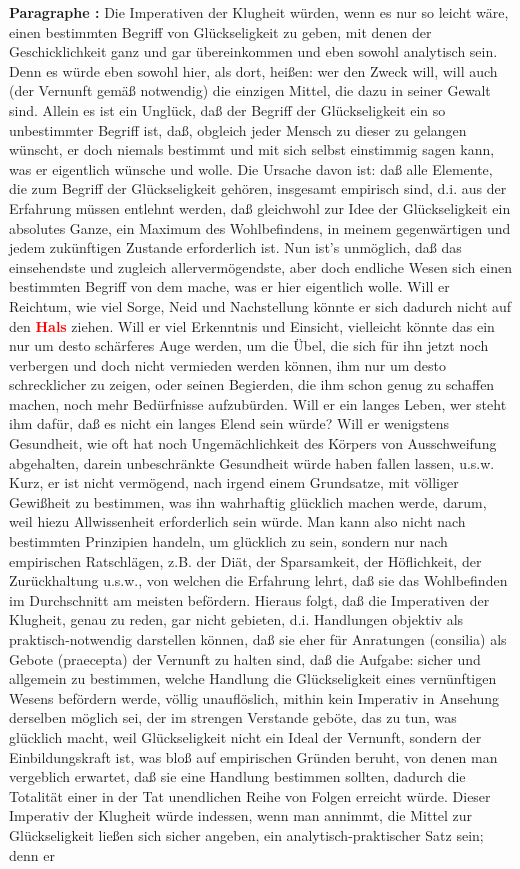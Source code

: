 \documentclass[a4paper,12pt,twoside]{book}
\newcommand{\match}[1]{\textcolor{red}{\textbf{#1}}}
\begin{document}
	\noindent\textbf{Paragraphe : }Die Imperativen der Klugheit würden, wenn es nur so leicht wäre, einen bestimmten Begriff von Glückseligkeit zu geben, mit denen der Geschicklichkeit ganz und gar übereinkommen und eben sowohl analytisch sein. Denn es würde eben sowohl hier, als dort, heißen: wer den Zweck will, will auch (der Vernunft gemäß notwendig) die einzigen Mittel, die dazu in seiner Gewalt sind. Allein es ist ein Unglück, daß der Begriff der Glückseligkeit ein so unbestimmter Begriff ist, daß, obgleich jeder Mensch zu dieser zu gelangen wünscht, er doch niemals bestimmt und mit sich selbst einstimmig sagen kann, was er eigentlich wünsche und wolle. Die Ursache davon ist: daß alle Elemente, die zum Begriff der Glückseligkeit gehören, insgesamt empirisch sind, d.i. aus der Erfahrung müssen entlehnt werden, daß gleichwohl zur Idee der Glückseligkeit ein absolutes Ganze, ein Maximum des Wohlbefindens, in meinem gegenwärtigen und jedem zukünftigen Zustande erforderlich ist. Nun ist's unmöglich, daß das einsehendste und zugleich allervermögendste, aber doch endliche Wesen sich einen bestimmten Begriff von dem mache, was er hier eigentlich wolle. Will er Reichtum, wie viel Sorge, Neid und Nachstellung könnte er sich dadurch nicht auf den \match{Hals} ziehen. Will er viel Erkenntnis und Einsicht, vielleicht könnte das ein nur um desto schärferes Auge werden, um die Übel, die sich für ihn jetzt noch verbergen und doch nicht vermieden werden können, ihm nur  um desto schrecklicher zu zeigen, oder seinen Begierden, die ihm schon genug zu schaffen machen, noch mehr Bedürfnisse aufzubürden. Will er ein langes Leben, wer steht ihm dafür, daß es nicht ein langes Elend sein würde? Will er wenigstens Gesundheit, wie oft hat noch Ungemächlichkeit des Körpers von Ausschweifung abgehalten, darein unbeschränkte Gesundheit würde haben fallen lassen, u.s.w. Kurz, er ist nicht vermögend, nach irgend einem Grundsatze, mit völliger Gewißheit zu bestimmen, was ihn wahrhaftig glücklich machen werde, darum, weil hiezu Allwissenheit erforderlich sein würde. Man kann also nicht nach bestimmten Prinzipien handeln, um glücklich zu sein, sondern nur nach empirischen Ratschlägen, z.B. der Diät, der Sparsamkeit, der Höflichkeit, der Zurückhaltung u.s.w., von welchen die Erfahrung lehrt, daß sie das Wohlbefinden im Durchschnitt am meisten befördern. Hieraus folgt, daß die Imperativen der Klugheit, genau zu reden, gar nicht gebieten, d.i. Handlungen objektiv als praktisch-notwendig darstellen können, daß sie eher für Anratungen (consilia) als Gebote (praecepta) der Vernunft zu halten sind, daß die Aufgabe: sicher und allgemein zu bestimmen, welche Handlung die Glückseligkeit eines vernünftigen Wesens befördern werde, völlig unauflöslich, mithin kein Imperativ in Ansehung derselben möglich sei, der im strengen Verstande geböte, das zu tun, was glücklich macht, weil Glückseligkeit nicht ein Ideal der Vernunft, sondern der Einbildungskraft ist, was bloß auf empirischen Gründen beruht, von denen man vergeblich erwartet, daß sie eine Handlung bestimmen sollten, dadurch die Totalität einer in der Tat unendlichen Reihe von Folgen erreicht würde. Dieser Imperativ der Klugheit würde indessen, wenn man annimmt, die Mittel zur Glückseligkeit ließen sich sicher angeben, ein analytisch-praktischer Satz sein; denn er 
\end{document}
